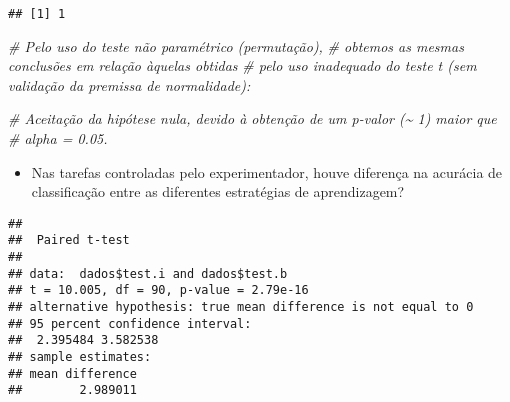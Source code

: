 \documentclass[
]{article}
\newenvironment{Shaded}{\begin{snugshade}}{\end{snugshade}}
\newcommand{\AttributeTok}[1]{\textcolor[rgb]{0.13,0.29,0.53}{#1}}
\newcommand{\CommentTok}[1]{\textcolor[rgb]{0.56,0.35,0.01}{\textit{#1}}}
\newcommand{\ConstantTok}[1]{\textcolor[rgb]{0.56,0.35,0.01}{#1}}
\newcommand{\FunctionTok}[1]{\textcolor[rgb]{0.13,0.29,0.53}{\textbf{#1}}}
\newcommand{\NormalTok}[1]{#1}
\newcommand{\OtherTok}[1]{\textcolor[rgb]{0.56,0.35,0.01}{#1}}
\newcommand{\SpecialCharTok}[1]{\textcolor[rgb]{0.81,0.36,0.00}{\textbf{#1}}}
\providecommand{\tightlist}{%
  \setlength{\itemsep}{0pt}\setlength{\parskip}{0pt}}
\begin{document}
\begin{verbatim}
## [1] 1
\end{verbatim}

\begin{Shaded}
\begin{Highlighting}[]
\CommentTok{\# Pelo uso do teste não paramétrico (permutação),}
\CommentTok{\# obtemos as mesmas conclusões em relação àquelas obtidas}
\CommentTok{\# pelo uso inadequado do \textasciigrave{}teste t\textasciigrave{} (sem validação da premissa de normalidade):}

\CommentTok{\# Aceitação da hipótese nula, devido à obtenção de um p{-}valor (\textasciitilde{} 1) maior que}
\CommentTok{\# alpha = 0.05.}
\end{Highlighting}
\end{Shaded}

\begin{itemize}
\tightlist
\item
  Nas tarefas controladas pelo experimentador, houve diferença na
  acurácia de classificação entre as diferentes estratégias de
  aprendizagem?
\end{itemize}

\begin{Shaded}
\end{Shaded}

\begin{verbatim}
## 
##  Paired t-test
## 
## data:  dados$test.i and dados$test.b
## t = 10.005, df = 90, p-value = 2.79e-16
## alternative hypothesis: true mean difference is not equal to 0
## 95 percent confidence interval:
##  2.395484 3.582538
## sample estimates:
## mean difference 
##        2.989011
\end{verbatim}
\end{document}
